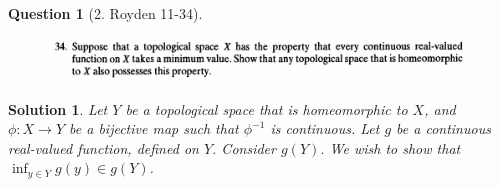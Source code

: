 \documentclass{article} %
\theoremstyle{quest}
\newtheorem*{question}{Question}
\newtheorem*{solution}{Solution}
\begin{document}
\newpage

\begin{question}[2. Royden 11-34]
\hfill
\begin{figure}[h!]
  \centering
    \includegraphics[width=1\textwidth]{11-34}
\end{figure}
\end{question}
\begin{solution}
Let $Y$ be a topological space that is homeomorphic to $X$, and
$\phi:X \to Y$ be a bijective map such that $\phi^{-1}$ is continuous.
Let $g$ be a continuous real-valued function, defined on $Y$. Consider
$g(Y)$. We wish to show that $\inf_{y \in Y} g(y) \in g(Y)$.  

\end{solution}

\newpage
\end{document}
